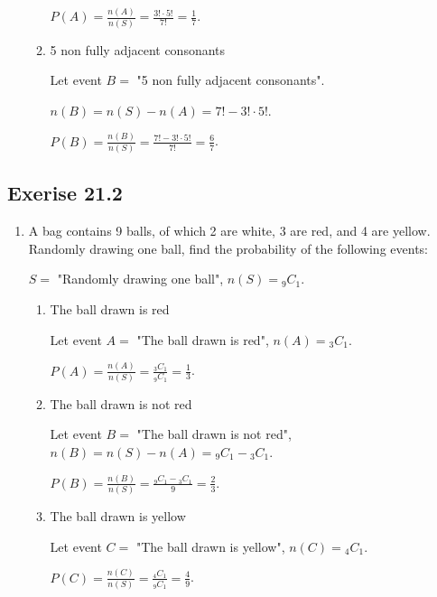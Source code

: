 \documentclass{report}
\newcommand\comb[2][^n]{{}_{#1}C_{#2}}
\begin{document}
\begin{multicols}{2}
\begin{enumerate}
\begin{enumerate}
                  $P(A) = \frac{n(A)}{n(S)} = \frac{3! \cdot 5!}{7!} = \frac{1}{7}$.

            \item 5 non fully adjacent consonants
                  \sol{}

                  Let event $B =$ "5 non fully adjacent consonants".

                  $n(B) = n(S) - n(A) = 7! - 3! \cdot 5!$.

                  $P(B) = \frac{n(B)}{n(S)} = \frac{7! - 3! \cdot 5!}{7!} = \frac{6}{7}$.
          \end{enumerate}
  \end{enumerate}

  \subsection{Exerise 21.2}

  \begin{enumerate}
    \item A bag contains 9 balls, of which 2 are white, 3 are red, and 4 are yellow.
          Randomly drawing one ball, find the probability of the following events: \sol{}

          $S =$ "Randomly drawing one ball", $n(S) = \comb[9]{1}$.

          \begin{enumerate}
            \item The ball drawn is red \sol{}

                  Let event $A =$ "The ball drawn is red", $n(A) = \comb[3]{1}$.

                  $P(A) = \frac{n(A)}{n(S)} = \frac{\comb[3]{1}}{\comb[9]{1}} = \frac{1}{3}$.

            \item The ball drawn is not red \sol{}

                  Let event $B =$ "The ball drawn is not red", $n(B) = n(S) - n(A) = \comb[9]{1}
                    - \comb[3]{1}$.

                  $P(B) = \frac{n(B)}{n(S)} = \frac{\comb[9]{1} - \comb[3]{1}}{9} = \frac{2}{3}$.

            \item The ball drawn is yellow \sol{}

                  Let event $C =$ "The ball drawn is yellow", $n(C) = \comb[4]{1}$.

                  $P(C) = \frac{n(C)}{n(S)} = \frac{\comb[4]{1}}{\comb[9]{1}} = \frac{4}{9}$.
          \end{enumerate}


\end{enumerate}
\end{multicols}
\end{document}
